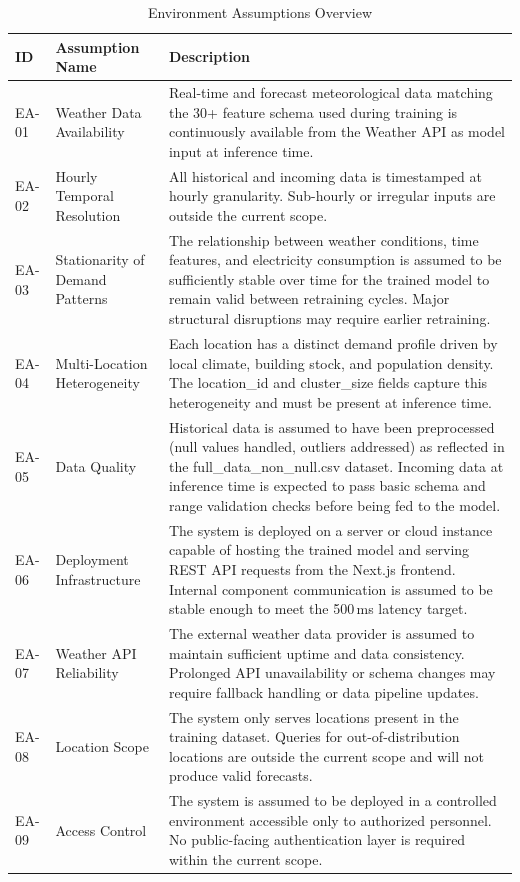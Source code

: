 \documentclass[12pt, a4paper]{report}
\begin{document}
\begin{table}[!h]
    \centering
    \caption{Environment Assumptions Overview}
    \begin{tabular}{p{1cm}|p{3.5cm}|p{10cm}}
        \toprule
        \textbf{ID} & \textbf{Assumption Name} & \textbf{Description} \\
        \hline
        EA-01 & Weather Data Availability & Real-time and forecast meteorological data matching the 30+ feature schema used during training is continuously available from the Weather API as model input at inference time. \\
        \hline
        EA-02 & Hourly Temporal Resolution & All historical and incoming data is timestamped at hourly granularity. Sub-hourly or irregular inputs are outside the current scope. \\
        \hline
        EA-03 & Stationarity of Demand Patterns & The relationship between weather conditions, time features, and electricity consumption is assumed to be sufficiently stable over time for the trained model to remain valid between retraining cycles. Major structural disruptions may require earlier retraining. \\
        \hline
        EA-04 & Multi-Location Heterogeneity & Each location has a distinct demand profile driven by local climate, building stock, and population density. The location\_id and cluster\_size fields capture this heterogeneity and must be present at inference time. \\
        \hline
        EA-05 & Data Quality & Historical data is assumed to have been preprocessed (null values handled, outliers addressed) as reflected in the full\_data\_non\_null.csv dataset. Incoming data at inference time is expected to pass basic schema and range validation checks before being fed to the model. \\
        \hline
        EA-06 & Deployment Infrastructure & The system is deployed on a server or cloud instance capable of hosting the trained model and serving REST API requests from the Next.js frontend. Internal component communication is assumed to be stable enough to meet the 500\,ms latency target. \\
        \hline
        EA-07 & Weather API Reliability & The external weather data provider is assumed to maintain sufficient uptime and data consistency. Prolonged API unavailability or schema changes may require fallback handling or data pipeline updates. \\
        \hline
        EA-08 & Location Scope & The system only serves locations present in the training dataset. Queries for out-of-distribution locations are outside the current scope and will not produce valid forecasts. \\
        \hline %
        EA-09 & Access Control & The system is assumed to be deployed in a controlled environment accessible only to authorized personnel. No public-facing authentication layer is required within the current scope. \\
        \bottomrule
    \end{tabular}
    \label{tab:environment-assumptions}
\end{table}
\end{document}
